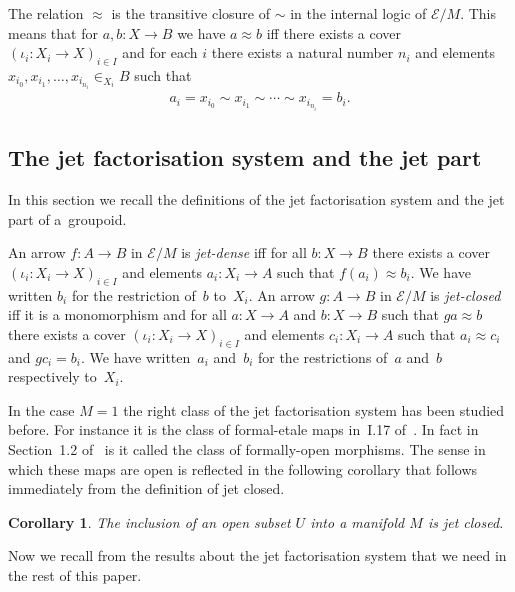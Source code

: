 \documentclass[10pt,a4paper]{amsart}
\numberwithin{equation}{section}
\newtheorem{Corollary}[Theorem]{Corollary}
\begin{document}
The relation $\approx$ is the transitive closure of $\sim$ in the internal logic of $\mathcal{E}/M$. This means that for $a,b\colon X \rightarrow B$ we have $a\approx b$ if\/f there exists a cover $(\iota_{i}\colon X_{i}\rightarrow X)_{i\in I}$ and for each $i$ there exists a natural number $n_{i}$ and elements $x_{i_{0}},x_{i_{1}},\dots ,x_{i_{n_{i}}}\in_{X_{i}}B$ such that
\begin{gather*}a_{i}=x_{i_{0}}\sim x_{i_{1}}\sim\cdots \sim x_{i_{n_{i}}}=b_{i}.\end{gather*}

\subsection{The jet factorisation system and the jet part}

In this section we recall the def\/initions of the jet factorisation system and the jet part of a~groupoid.

An arrow $f\colon A \rightarrow B$ in $\mathcal{E}/M$ is \emph{jet-dense} if\/f for all $b\colon X \rightarrow B$ there exists a cover $(\iota_{i}\colon X_{i}\rightarrow X)_{i\in I}$ and elements $a_{i}\colon X_i \rightarrow A$ such that $f(a_{i})\approx b_{i}$. We have written $b_i$ for the restriction of~$b$ to~$X_i$. An arrow $g\colon A \rightarrow B$ in $\mathcal{E}/M$ is \emph{jet-closed} if\/f it is a monomorphism and for all $a\colon X \rightarrow A$ and $b\colon X \rightarrow B$ such that $ga\approx b$ there exists a cover $(\iota_{i}\colon X_{i}\rightarrow X)_{i\in I}$ and elements $c_{i}\colon X_i \rightarrow A$ such that $a_{i}\approx c_{i}$ and $gc_{i}=b_{i}$. We have written~$a_i$ and~$b_i$ for the restrictions of~$a$ and~$b$ respectively to~$X_i$.

In the case $M=1$ the right class of the jet factorisation system has been studied before. For instance it is the class of formal-etale maps in~I.17 of~\cite{MR2244115}. In fact in Section~1.2 of~\cite{Johnstone2014} is it called the class of formally-open morphisms.
The sense in which these maps are open is ref\/lected in the following corollary that follows immediately from the def\/inition of jet closed.

\begin{Corollary}\label{cor:open-inclusion-is-jet-closed} The inclusion of an open subset $U$ into a manifold $M$ is jet closed.
\end{Corollary}

Now we recall from \cite{burke-relative-to-local-models} the results about the jet factorisation system that we need in the rest of this paper.
\end{document}
